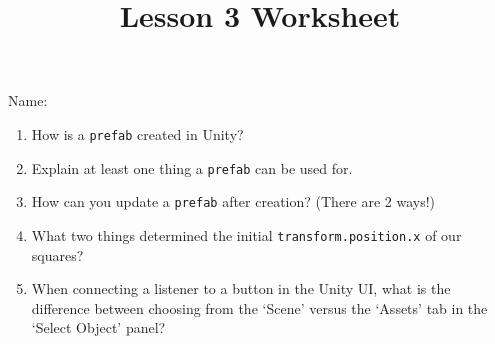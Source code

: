 \documentclass[12pt]{../rhitcsse}
\title{Lesson 3 Worksheet}
\begin{document}
\maketitle

\vspace*{0.15in}\hspace{0.25in}Name:\hrulefill\hspace{0.25in}\hspace{0.25in}

\begin{enumerate}
  \item How is a \texttt{prefab} created in Unity? 
  \vfill

  \item Explain at least one thing a \texttt{prefab} can be used for.
  \vfill

  \item How can you update a \texttt{prefab} after creation? (There are 2 ways!) 
  \vfill
  \clearpage

  \item What two things determined the initial \texttt{transform.position.x} of our squares?
  \vfill
  
  \item When connecting a listener to a button in the Unity UI, what is the difference 
  between choosing from the `Scene' versus the `Assets' tab in the `Select Object' panel?
  \vfill
  
\end{enumerate}
\end{document}
